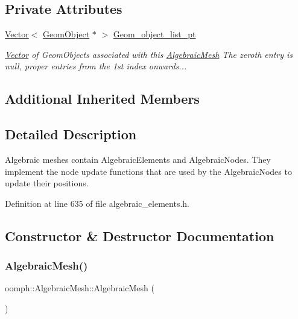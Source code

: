 \subsection*{Private Attributes}
\begin{DoxyCompactItemize}
\item 
\hyperlink{classoomph_1_1Vector}{Vector}$<$ \hyperlink{classoomph_1_1GeomObject}{Geom\+Object} $\ast$ $>$ \hyperlink{classoomph_1_1AlgebraicMesh_ab823bbf2e61cf588a2ae2299c5717141}{Geom\+\_\+object\+\_\+list\+\_\+pt}
\begin{DoxyCompactList}\small\item\em \hyperlink{classoomph_1_1Vector}{Vector} of Geom\+Objects associated with this \hyperlink{classoomph_1_1AlgebraicMesh}{Algebraic\+Mesh} The zeroth entry is null, proper entries from the 1st index onwards... \end{DoxyCompactList}\end{DoxyCompactItemize}
\subsection*{Additional Inherited Members}


\subsection{Detailed Description}
Algebraic meshes contain Algebraic\+Elements and Algebraic\+Nodes. They implement the node update functions that are used by the Algebraic\+Nodes to update their positions. 

Definition at line 635 of file algebraic\+\_\+elements.\+h.



\subsection{Constructor \& Destructor Documentation}
\mbox{\label{classoomph_1_1AlgebraicMesh_a27bab6278bc48a4bf5d22874fc1a0e16}} 
\subsubsection{\texorpdfstring{Algebraic\+Mesh()}{AlgebraicMesh()}\hspace{0.1cm}{\footnotesize\ttfamily [1/2]}}
{\footnotesize\ttfamily oomph\+::\+Algebraic\+Mesh\+::\+Algebraic\+Mesh (\begin{DoxyParamCaption}{ }\end{DoxyParamCaption})\hspace{0.3cm}{\ttfamily [inline]}}

